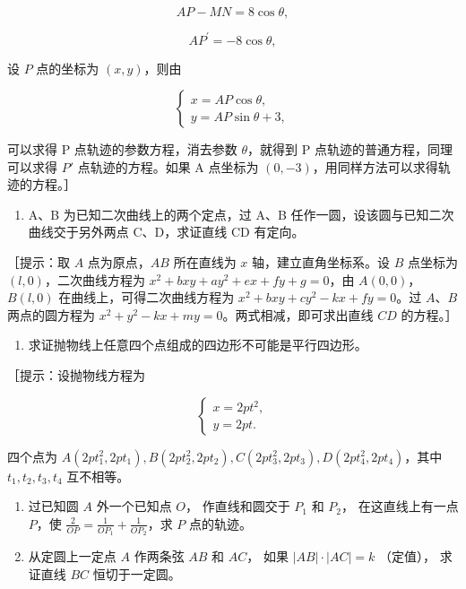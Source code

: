 \[
AP - MN = 8 \cos \theta,
\]

\[
AP^{\prime} = - 8 \cos \theta,
\]

设 \(P\) 点的坐标为 \((x, y)\)，则由

\[
\left\{ \begin{array}{l} x = AP \cos \theta, \\ y = AP \sin \theta + 3, \end{array} \right.
\]

可以求得 P 点轨迹的参数方程，消去参数 \(\theta\)，就得到 P
点轨迹的普通方程，同理可以求得 \(P'\) 点轨迹的方程。如果 A 点坐标为
\((0, -3)\)，用同样方法可以求得轨迹的方程。］

\begin{enumerate}
\def\labelenumi{\arabic{enumi}.}
\setcounter{enumi}{26}
\tightlist
\item
  A、B 为已知二次曲线上的两个定点，过 A、B
  任作一圆，设该圆与已知二次曲线交于另外两点 C、D，求证直线 CD 有定向。
\end{enumerate}

［提示：取 \(A\) 点为原点，\(AB\) 所在直线为 \(x\)
轴，建立直角坐标系。设 \(B\) 点坐标为 \((l, 0)\)，二次曲线方程为
\(x^2 + bxy + ay^2 + ex + fy + g = 0\)，由 \(A(0, 0)\)，\(B(l, 0)\)
在曲线上，可得二次曲线方程为 \(x^2 + bxy + cy^2 - kx + fy = 0\)。过
\(A\)、\(B\) 两点的圆方程为
\(x^2 + y^2 - kx + my = 0\)。两式相减，即可求出直线 \(CD\) 的方程。］

\begin{enumerate}
\def\labelenumi{\arabic{enumi}.}
\setcounter{enumi}{27}
\tightlist
\item
  求证抛物线上任意四个点组成的四边形不可能是平行四边形。
\end{enumerate}

［提示：设抛物线方程为

\[
\left\{ \begin{array}{l} x = 2 p t^{2}, \\ y = 2 p t. \end{array} \right.
\]

四个点为
\(A(2pt_1^2, 2pt_1), B(2pt_2^2, 2pt_2), C(2pt_3^2, 2pt_3), D(2pt_4^2, 2pt_4)\)，其中
\(t_1, t_2, t_3, t_4\) 互不相等。

\begin{enumerate}
\def\labelenumi{\arabic{enumi}.}
\setcounter{enumi}{28}
\item
  过已知圆 \(A\) 外一个已知点 \(O\)， 作直线和圆交于 \(P_{1}\) 和
  \(P_{2}\)， 在这直线上有一点 \(P\)，使
  \(\frac{2}{OP} = \frac{1}{OP_1} +\frac{1}{OP_2}\)，求 \(P\) 点的轨迹。
\item
  从定圆上一定点 \(A\) 作两条弦 \(AB\) 和 \(AC\)， 如果
  \(|AB| \cdot |AC| = k\) （定值）， 求证直线 \(BC\) 恒切于一定圆。
\end{enumerate}

